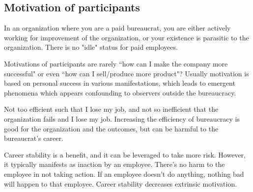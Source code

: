 \subsection{Motivation of participants}

In an organization where you are a paid bureaucrat, you are either actively working for improvement of the organization, or your existence is parasitic to the organization. There is no "idle" status for paid employees.

Motivations of participants are rarely ``how can I make the company more successful" or even ``how can I sell/produce more product"? Usually motivation is based on personal success in various manifestations, which leads to emergent phenomena which appears confounding to observers outside the bureaucracy. 

Not too efficient such that I lose my job, and not so inefficient that the organization fails and I lose my job. Increasing the efficiency of bureaucracy is good for the organization and the outcomes, but can be harmful to the bureaucrat's career.

Career stability is a benefit, and it can be leveraged to take more risk. However, it typically manifests as inaction by an employee. There's no harm to the employee in not taking action. If an employee doesn't do anything, nothing bad will happen to that employee. Career stability decreases extrinsic motivation.